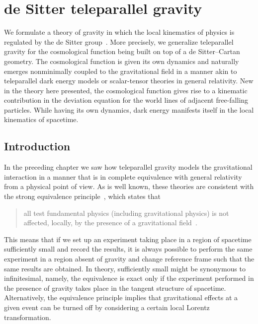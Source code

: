 \documentclass[
final,
11pt,
a4paper,
DIV=11,
headinclude=true,
footinclude=false,
bibliography=totoc,
twoside=true,  %
BCOR=5mm
]{scrbook}
\begin{document}
\chapter{de Sitter teleparallel gravity}
\label{ch:dSTG}

We formulate a theory of gravity in which the local kinematics of 
physics is regulated by the de Sitter 
group~\cite{Jennen:2015bxa}. More precisely, we generalize 
teleparallel gravity for the cosmological function being built on 
top of a de Sitter--Cartan geometry. The cosmological function is 
given its own dynamics and naturally emerges nonminimally coupled 
to the gravitational field in a manner akin to teleparallel dark 
energy models or scalar-tensor theories in  general relativity.  
New in the theory here presented, the cosmological function gives 
rise to a kinematic contribution in the deviation equation for 
the world lines of adjacent free-falling particles. While having 
its own dynamics, dark energy manifests itself in the local 
kinematics of spacetime.

\section{Introduction}
\label{sec:dSTG_intro}

In the preceding chapter we saw how teleparallel gravity models 
the gravitational interaction in a manner that is in complete 
equivalence with general relativity from a physical point of 
view. As is well known, these theories are consistent with the 
strong equivalence principle~\cite{Weinberg:1972gc, 
  aldrovandi:2012tele}, which states that
\begin{quote}
all test fundamental physics (including gravitational physics) is 
not affected, locally, by the presence of a gravitational 
field~\cite{DiCasola:2013iia}.
\end{quote}
This means that if we set up an experiment taking place in 
a region of spacetime sufficiently small and record the results, 
it is always possible to perform the same experiment in a region 
absent of gravity and change reference frame such that the same 
results are obtained. In theory, sufficiently small might be 
synonymous to infinitesimal, namely, the equivalence is exact 
only if the experiment performed in the presence of gravity takes 
place in the tangent structure of spacetime. Alternatively, the 
equivalence principle implies that gravitational effects at 
a given event can be turned off by considering a certain local 
Lorentz transformation.
\end{document}
